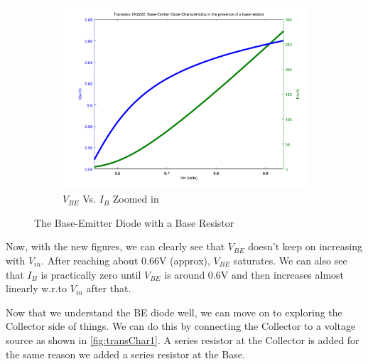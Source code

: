 \begin{figure}[h!]
{\begin{subfigure}[b]{0.85\textwidth}
			\includegraphics[width = \textwidth]{partHW/NPN_2N2222_Vin_Vbe_Ib_zoomed}
			\caption{$V_{BE}$ Vs. $ I_B$ Zoomed in}
			\label{fig:VbeIbVsVin_zoomed}
		\end{subfigure}
		}
		\caption{The Base-Emitter Diode with a Base Resistor}
		\label{collage:beDiodeWithRb}
	\end{figure}



Now, with the new figures, we can clearly see that $V_{BE}$ doesn't keep on increasing with $V_{in}$. After reaching about 0.66V (approx), $V_{BE}$ saturates. We can also see that $I_B$ is practically zero until $V_{BE}$ is around 0.6V and then increases almost linearly w.r.to $V_{in}$ after that. 

Now that we understand the BE diode well, we can move on to exploring the Collector side of things. We can do this by connecting the Collector to a voltage source as shown in \autoref{fig:transChar1}. A series resistor at the Collector is added for the same reason we added a series resistor at the Base.  

